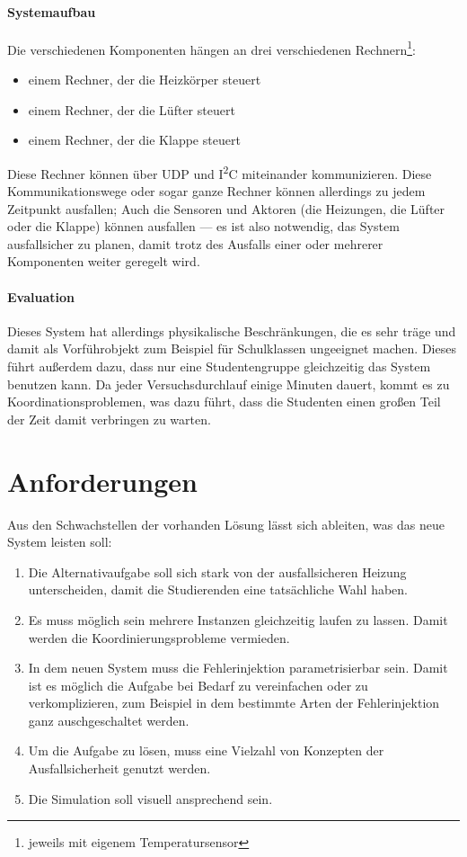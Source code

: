 \paragraph{Systemaufbau} Die verschiedenen Komponenten h{\"{a}}ngen an drei verschiedenen Rechnern\footnote{jeweils mit eigenem Temperatursensor}:
\begin{itemize}
\item einem Rechner, der die Heizk{\"{o}}rper steuert
\item einem Rechner, der die L{\"{u}}fter steuert
\item einem Rechner, der die Klappe steuert
\end{itemize}

Diese Rechner k{\"{o}}nnen {\"{u}}ber UDP und I\textsuperscript{2}C miteinander kommunizieren. Diese Kommunikationswege oder sogar ganze Rechner k{\"{o}}nnen
allerdings zu jedem Zeitpunkt ausfallen; Auch die Sensoren und Aktoren (die Heizungen, die L{\"{u}}fter oder die Klappe) k{\"{o}}nnen ausfallen --- es ist also notwendig, das
System ausfallsicher zu planen, damit trotz des Ausfalls einer oder mehrerer Komponenten weiter geregelt wird.

\paragraph{Evaluation} Dieses System hat allerdings physikalische Beschr{\"{a}}nkungen, die es sehr tr{\"{a}}ge und damit als Vorf{\"{u}}hrobjekt zum Beispiel f{\"{u}}r Schulklassen
ungeeignet machen. Dieses f{\"{u}}hrt au{\ss}erdem dazu, dass nur eine Studentengruppe gleichzeitig das System benutzen kann. Da jeder Versuchsdurchlauf einige Minuten dauert, kommt es zu
Koordinationsproblemen, was dazu f{\"{u}}hrt, dass die Studenten einen gro{\ss}en Teil der Zeit damit verbringen zu warten.

\clearpage
\section{Anforderungen}\label{anforderung}
Aus den Schwachstellen der vorhanden L{\"{o}}sung l{\"{a}}sst sich ableiten, was das neue System leisten soll:
\begin{enumerate}
	\item Die Alternativaufgabe soll sich stark von der ausfallsicheren Heizung unterscheiden, damit die Studierenden eine tats{\"{a}}chliche Wahl haben.
	\item Es muss m{\"{o}}glich sein mehrere Instanzen gleichzeitig laufen zu lassen. Damit werden die Koordinierungsprobleme vermieden.
	\item In dem neuen System muss die Fehlerinjektion parametrisierbar sein. Damit ist es m{\"{o}}glich
		die Aufgabe bei Bedarf zu vereinfachen oder zu verkomplizieren, zum Beispiel in dem bestimmte
		Arten der Fehlerinjektion ganz auschgeschaltet werden.
	\item Um die Aufgabe zu l{\"{o}}sen, muss eine Vielzahl von Konzepten der Ausfallsicherheit genutzt werden.
	\item Die Simulation soll visuell ansprechend sein.
\end{enumerate}

